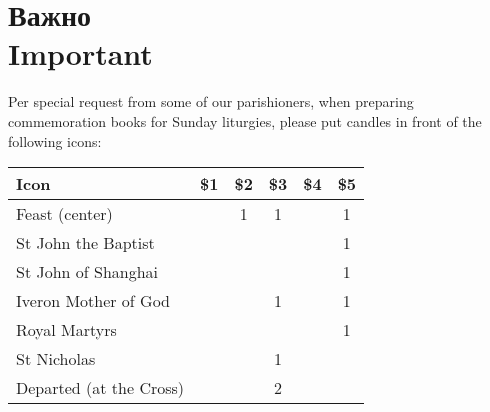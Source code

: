 \section*{Важно\\Important}

Per special request from some of our parishioners, when preparing commemoration books for Sunday liturgies, please put candles in 
front of the following icons:

\begin{longtable}[]{@{}lccccc@{}}
\toprule()
Icon & \$1 & \$2 & \$3 & \$4 & \$5 \\
\midrule()
\endhead
Feast (center) & & 1 & 1 & & 1 \\
St John the Baptist & & & & & 1 \\
St John of Shanghai & & & & & 1 \\
Iveron Mother of God & & & 1 & & 1 \\
Royal Martyrs & & & & & 1 \\
St Nicholas & & & 1 & & \\
Departed (at the Cross) & & & 2 & & \\
\bottomrule()
\end{longtable}

